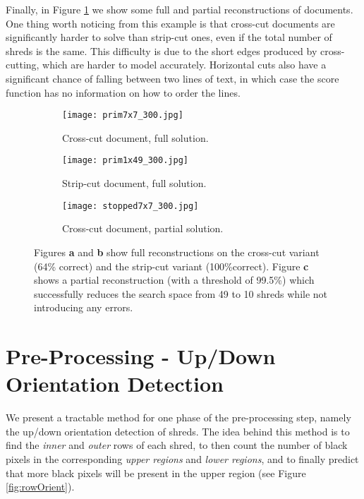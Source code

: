 \documentclass{llncs}
\begin{document}
Finally, in Figure \ref{fig:searchRez} we show some full and partial reconstructions of documents. One thing worth noticing from this example is that cross-cut documents are significantly harder to solve than strip-cut ones, even if the total number of shreds is the same. This difficulty is due to the short edges produced by cross-cutting, which are harder to model accurately. Horizontal cuts also have a significant chance of falling between two lines of text, in which case the score function has no information on how to order the lines.

\begin{figure}[h!]
    \centering
    \begin{subfigure}[b]{\textwidth}
        \centering
        \texttt{[image: prim7x7\_300.jpg]}
        \caption{Cross-cut document, full solution.}
    \end{subfigure}
    \begin{subfigure}[b]{0.48\textwidth}
        \centering
        \texttt{[image: prim1x49\_300.jpg]}
        \caption{Strip-cut document, full solution.}
    \end{subfigure}
    \begin{subfigure}[b]{0.48\textwidth}
        \centering
        \texttt{[image: stopped7x7\_300.jpg]}
        \caption{Cross-cut document, partial solution.}
    \end{subfigure}
     \caption{Figures {\bf a} and {\bf b} show full reconstructions on the cross-cut variant (64\% correct) and the strip-cut variant (100\%correct). Figure {\bf c} shows a partial reconstruction (with a threshold of 99.5\%) which successfully reduces the search space from 49 to 10 shreds while not introducing any errors.}
    \label{fig:searchRez}
\end{figure}

\section{Pre-Processing - Up/Down Orientation Detection}
We present a tractable method for one phase of the pre-processing step, namely the up/down orientation detection of shreds. 
The idea behind this method is to find the \emph{inner} and \emph{outer} rows of each shred, to then count the number of black pixels in the corresponding \emph{upper regions} and \emph{lower regions}, and to finally predict that more black pixels will be present in the upper region (see Figure \ref{fig:rowOrient}). 
\end{document}
